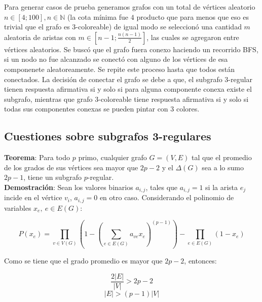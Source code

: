 \documentclass{article}
\begin{document}
Para generar casos de prueba generamos grafos con un total de v\'ertices aleatorio $n \in [4;100], n \in \mathbb{N}$ (la cota m\'inima fue $4$ producto que para menos que eso es trivial que el grafo es $3$-coloreable) 
de igual modo se seleccion\'o una cantidad $m$ aleatoria de aristas con $m \in [n-1; \frac{n(n-1)}{2}]$, las cuales se agregaron entre v\'ertices aleatorios. Se busc\'o que el grafo fuera conexo haciendo un recorrido BFS, si un nodo no fue alcanzado 
se conect\'o con alguno de los v\'ertices de esa componenete aleatoreamente. Se repite este proceso hasta que todos est\'an conectados. La decisi\'on de conectar el grafo se debe a que, el subgrafo $3$-regular tienen respuesta afirmativa 
si y solo si para alguna componente conexa existe el subgrafo, mientras que grafo $3$-coloreable tiene respuesta afirmativa si y solo si todas sus componentes conexas se pueden pintar con $3$ colores.\\ 







\subsection*{Cuestiones sobre subgrafos 3-regulares}

\textbf{Teorema}: Para todo $p$ primo, cualquier grafo $G=(V,E)$ tal que el promedio de los grados de sus v\'ertices sea mayor que 
$2p-2$ y el $\Delta(G)$ sea a lo sumo $2p -1$, tiene un subgrafo $p$-regular.\\ 

\textbf{Demostraci\'on}: Sean los valores binarios $a_{i,j}$, tales que $a_{i,j} = 1$ si la arista $e_{j}$ incide en el v\'ertice $v_i$, $a_{i,j} = 0$ en otro caso.
Considerando el polinomio de variables $x_e,~ e\in E(G)$:

$$P(x_e) = \prod_{v \in V(G)} \left( 1 - \left(\sum_{e \in E(G)} a_{ve} x_e\right)^{(p-1)}\right) - \prod_{e \in E(G)} (1 - x_e)$$ 

Como se tiene que el grado promedio es mayor que $2p-2$, entonces: 

$$\frac{2|E|}{|V|} > 2p-2 $$
$$|E| > (p-1)|V|$$
\end{document}
